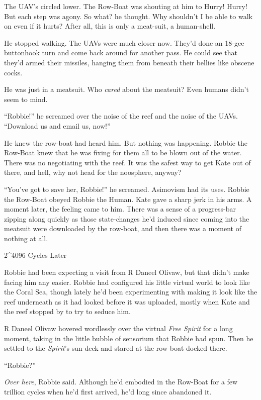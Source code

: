 The UAV’s circled lower. The Row-Boat was shouting at him to Hurry!
Hurry! But each step was agony. So what? he thought. Why shouldn’t
I be able to walk on even if it hurts? After all, this is only a
meat-suit, a human-shell.

He stopped walking. The UAVs were much closer now. They’d done an
18-gee buttonhook turn and come back around for another pass. He
could see that they’d armed their missiles, hanging them from
beneath their bellies like obscene cocks.

He was just in a meatsuit. Who \emph{cared} about the meatsuit?
Even humans didn’t seem to mind.

“Robbie!” he screamed over the noise of the reef and the noise of
the UAVs. “Download us and email us, now!”

He knew the row-boat had heard him. But nothing was happening.
Robbie the Row-Boat knew that he was fixing for them all to be
blown out of the water. There was no negotiating with the reef. It
was the safest way to get Kate out of there, and hell, why not head
for the noosphere, anyway?

“You’ve got to save her, Robbie!” he screamed. Asimovism had its
uses. Robbie the Row-Boat obeyed Robbie the Human. Kate gave a
sharp jerk in his arms. A moment later, the feeling came to him.
There was a sense of a progress-bar zipping along quickly as those
state-changes he’d induced since coming into the meatsuit were
downloaded by the row-boat, and then there was a moment of nothing
at all.

\tb

2\^{}4096 Cycles Later

Robbie had been expecting a visit from R Daneel Olivaw, but that
didn’t make facing him any easier. Robbie had configured his little
virtual world to look like the Coral Sea, though lately he’d been
experimenting with making it look like the reef underneath as it
had looked before it was uploaded, mostly when Kate and the reef
stopped by to try to seduce him.

R Daneel Olivaw hovered wordlessly over the virtual
\emph{Free Spirit} for a long moment, taking in the little bubble
of sensorium that Robbie had spun. Then he settled to the
\emph{Spirit}’s sun-deck and stared at the row-boat docked there.

“Robbie?”

\emph{Over here}, Robbie said. Although he’d embodied in the
Row-Boat for a few trillion cycles when he’d first arrived, he’d
long since abandoned it.

